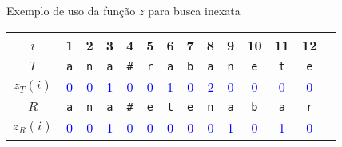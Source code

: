 \begin{frame}[fragile]{Exemplo de uso da função $z$ para busca inexata}

    \begin{center}
    \begin{tabular}{c|ccccccccccccc}
        $i$ & 1 & 2 & 3 & 4 & 5 & 6 & 7 & 8 & 9 & 10 & 11 & 12 \\
        \hline
        $T$
& \texttt{\textcolor{red!80!black}{a}} 
& \texttt{\textcolor{red!80!black}{n}} 
& \texttt{\textcolor{red!80!black}{a}} 
& \texttt{\textcolor{red!80!black}{\#}} 
& \texttt{\textcolor{red!80!black}{r}} 
& \texttt{\textcolor{red!80!black}{a}} 
& \texttt{\textcolor{red!80!black}{b}} 
& \texttt{\textcolor{red!80!black}{a}} 
& \texttt{\textcolor{red!80!black}{n}} 
& \texttt{\textcolor{red!80!black}{e}} 
& \texttt{\textcolor{red!80!black}{t}} 
& \texttt{\textcolor{red!80!black}{e}} 
\\
        $z_T(i)$
& \textcolor{blue}{0} 
& \textcolor{blue}{0} 
& \textcolor{blue}{1} 
& \textcolor{blue}{0} 
& \textcolor{blue}{0} 
& {\textcolor{blue}{1}}
& \textcolor{blue}{0} 
& {\textcolor{blue}{2}}
& \textcolor{blue}{0} 
& \textcolor{blue}{0} 
& \textcolor{blue}{0} 
& \textcolor{blue}{0} 
\\
        $R$
& \texttt{\textcolor{red!80!black}{a}} 
& \texttt{\textcolor{red!80!black}{n}} 
& \texttt{\textcolor{red!80!black}{a}} 
& \texttt{\textcolor{red!80!black}{\#}} 
& \texttt{\textcolor{red!80!black}{e}} 
& \texttt{\textcolor{red!80!black}{t}} 
& \texttt{\textcolor{red!80!black}{e}} 
& \texttt{\textcolor{red!80!black}{n}} 
& \texttt{\textcolor{red!80!black}{a}} 
& \texttt{\textcolor{red!80!black}{b}} 
& \texttt{\textcolor{red!80!black}{a}} 
& \texttt{\textcolor{red!80!black}{r}} 
\\
        $z_R(i)$
& \textcolor{blue}{0} 
& \textcolor{blue}{0} 
& \textcolor{blue}{1} 
& \textcolor{blue}{0} 
& \textcolor{blue}{0} 
& {\textcolor{blue}{0}}
& \textcolor{blue}{0} 
& {\textcolor{blue}{0}}
& \textcolor{blue}{1} 
& \textcolor{blue}{0} 
& \textcolor{blue}{1} 
& \textcolor{blue}{0} 
    \end{tabular}
    \end{center}
\end{frame}

